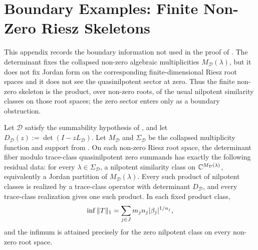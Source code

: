 \section{Boundary Examples: Finite Non-Zero Riesz Skeletons}\label{sec:finite-nonzero-nonnormal-skeletons}

This appendix records the boundary information not used in the proof of
.  The determinant fixes the
collapsed non-zero algebraic multiplicities \(M_{\mathcal D}(\lambda)\), but it
does not fix Jordan form on the corresponding finite-dimensional Riesz root
spaces and it does not see the quasinilpotent sector at zero.  Thus the finite
non-zero skeleton is the product, over non-zero roots, of the usual nilpotent
similarity classes on those root spaces; the zero sector enters only as a
boundary obstruction.

\begin{proposition}
  \label{thm:nonnormal-jordan-classification}
  Let \(\mathcal D\) satisfy the summability hypothesis of
  , and let
  \(D_{\mathcal D}(z):=\det(I-zL_{\mathcal D})\).  Let
  \(M_{\mathcal D}\) and \(\Sigma_{\mathcal D}\) be the collapsed multiplicity
  function and support from .
  On each non-zero Riesz root space, the determinant fiber modulo trace-class
  quasinilpotent zero summands has exactly the following residual data:
  for every \(\lambda\in\Sigma_{\mathcal D}\), a nilpotent similarity class on
  \(\mathbb{C}^{M_{\mathcal D}(\lambda)}\), equivalently a Jordan partition of
  \(M_{\mathcal D}(\lambda)\).  Every such product of nilpotent classes is
  realized by a trace-class operator with determinant \(D_{\mathcal D}\), and
  every trace-class realization gives one such product.  In each fixed product
  class,
  \[
    \inf \|T\|_1
    =\sum_{j\in J}m_jn_j\lvert \beta_j \rvert^{1/n_j},
  \]
  and the infimum is attained precisely for the zero nilpotent class on every
  non-zero root space.
\end{proposition}

